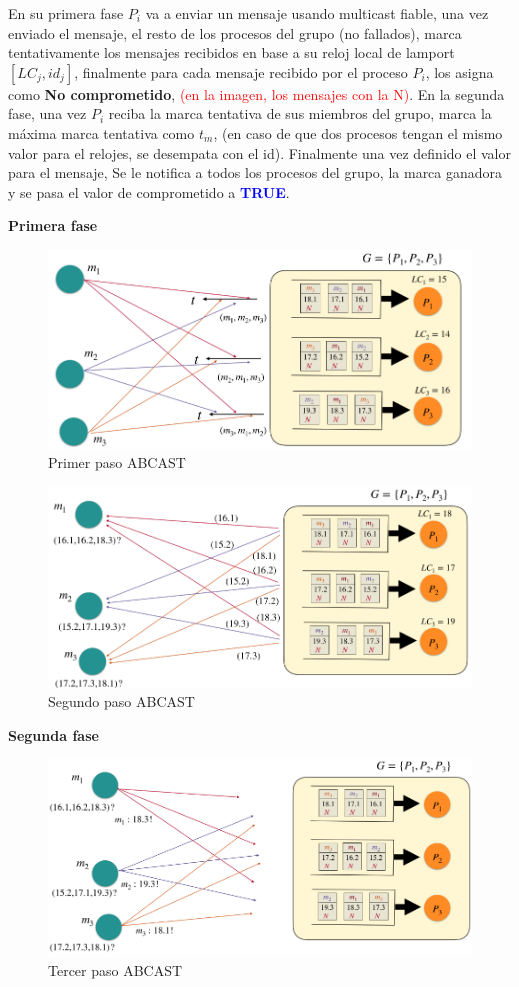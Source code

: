 En su primera fase $P_i$ va a enviar un mensaje usando multicast fiable, una vez enviado el mensaje, el resto de los procesos del grupo (no fallados), marca tentativamente los mensajes recibidos en base a su reloj local de lamport $\left[LC_j, id_j\right]$, finalmente para cada mensaje recibido por el proceso $P_i$, los asigna como \textbf{No comprometido}, \textcolor{red}{(en la imagen, los mensajes con la N)}. En la segunda fase, una vez $P_i$ reciba la marca tentativa de sus miembros del grupo, marca la máxima marca tentativa como $t_m$, (en caso de que dos procesos tengan el mismo valor para el relojes, se desempata con el id). Finalmente una vez definido el valor para el mensaje, Se le notifica a todos los procesos del grupo, la marca ganadora y se pasa el valor de comprometido a \textcolor{blue}{\textbf{TRUE}}.

\textbf{Primera fase}
\begin{figure}[H]
    \centering
    \includegraphics[width=0.7\linewidth]{img/Primer_paso.png}
    \caption{Primer paso ABCAST}\label{fig:1761653095435}
\end{figure}

\begin{figure}[H]
    \centering
    \includegraphics[width=0.7\linewidth]{img/Segundo_paso.png}
    \caption{Segundo paso ABCAST}\label{fig:1761653127112}
\end{figure}

\textbf{Segunda fase}

\begin{figure}[H]
    \centering
    \includegraphics[width=0.7\linewidth]{img/Tercer_paso.png}
    \caption{Tercer paso ABCAST}\label{fig:1761653161267}
\end{figure}

